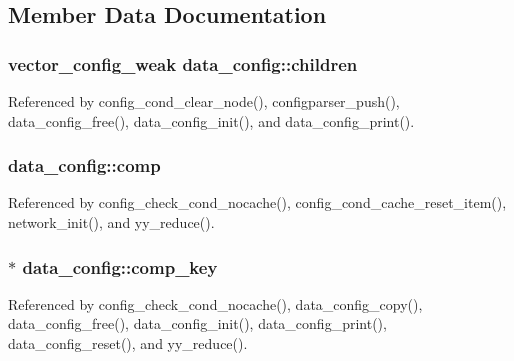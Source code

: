 \subsection{Member Data Documentation}
\hypertarget{structdata__config_a58a7a7b9dc732052d6114662d688f30e}{
\subsubsection[{children}]{\setlength{\rightskip}{0pt plus 5cm}vector\-\_\-config\-\_\-weak data\-\_\-config\-::children}}\label{structdata__config_a58a7a7b9dc732052d6114662d688f30e}


Referenced by config\-\_\-cond\-\_\-clear\-\_\-node(), configparser\-\_\-push(), data\-\_\-config\-\_\-free(), data\-\_\-config\-\_\-init(), and data\-\_\-config\-\_\-print().

\hypertarget{structdata__config_a850a9a892b7722bab782ded69eb4ce68}{
\subsubsection[{comp}]{ data\-\_\-config\-::comp}}\label{structdata__config_a850a9a892b7722bab782ded69eb4ce68}


Referenced by config\-\_\-check\-\_\-cond\-\_\-nocache(), config\-\_\-cond\-\_\-cache\-\_\-reset\-\_\-item(), network\-\_\-init(), and yy\-\_\-reduce().

\hypertarget{structdata__config_a17a994d31e938722167e19b5f59b8796}{
\subsubsection[{comp\-\_\-key}]{$\ast$ data\-\_\-config\-::comp\-\_\-key}}\label{structdata__config_a17a994d31e938722167e19b5f59b8796}


Referenced by config\-\_\-check\-\_\-cond\-\_\-nocache(), data\-\_\-config\-\_\-copy(), data\-\_\-config\-\_\-free(), data\-\_\-config\-\_\-init(), data\-\_\-config\-\_\-print(), data\-\_\-config\-\_\-reset(), and yy\-\_\-reduce().

